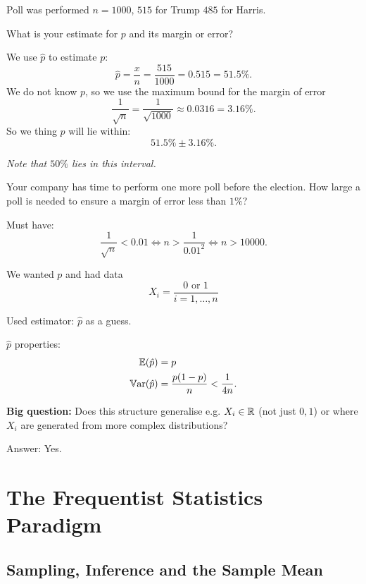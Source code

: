 \documentclass[10pt, a4paper]{article}
\begin{document}
\begin{example}
    Poll was performed $n = 1000$,
    $515$ for Trump $485$ for Harris.

    What is your estimate for $p$ and its margin or error?

    \begin{solution}
        We use $\hat{p}$ to estimate $p$:
        \[
        \hat{p} = \frac{x}{n} = \frac{515}{1000} = 0.515 = 51.5\%.
        \]
        We do not know $p$,
        so we use the maximum bound for the margin of error
        \[
        \frac{1}{\sqrt{n}} = \frac{1}{\sqrt{1000}} \approx 0.0316 = 3.16\%.
        \]
        So we thing $p$ will lie within:
        \[
        51.5\% \pm 3.16\%.
        \]

        \textit{Note that $50\%$ lies in this interval.}
    \end{solution}
\end{example}

\begin{example}
    Your company has time to perform one more poll before the election.
    How large a poll is needed to ensure a margin of error less than $1\%$?

    \begin{solution}
        Must have:
        \[
        \frac{1}{\sqrt{n}} < 0.01 \iff n > \frac{1}{0.01 ^ 2} \iff n > 10000.
        \]
    \end{solution}
\end{example}


We wanted $p$ and had data
\[
X_i = \frac{0 \text{ or } 1}{i = 1, \dotsc, n}
\]

Used estimator:
$\hat{p}$ as a guess.

$\hat{p}$ properties:
\begin{align*}
    \mathbb{E}(\hat{p}) &= p \\
    \mathbb{V}\mathrm{ar}(\hat{p}) &= \frac{p(1 - p)}{n} < \frac{1}{4n}.
\end{align*}

\textbf{Big question:}
Does this structure generalise e.g. $X_i \in \mathbb{R}$
(not just $0, 1$)
or where $X_i$ are generated from more complex distributions?

Answer:
Yes.

\section{The Frequentist Statistics Paradigm}

\subsection{Sampling,
Inference and the Sample Mean}
\end{document}
